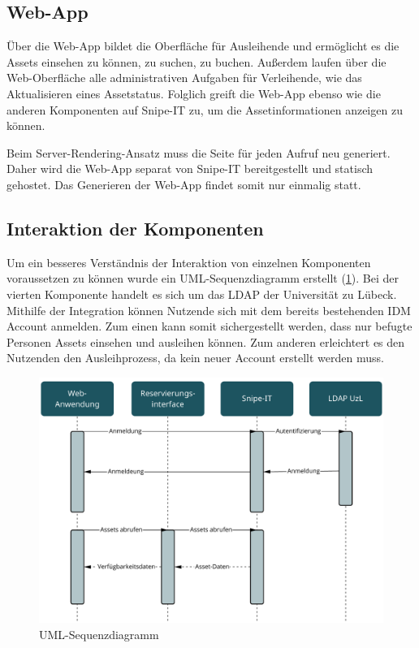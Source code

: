 \subsection{Web-App}
Über die Web-App bildet die Oberfläche für Ausleihende und ermöglicht es die Assets einsehen zu
können, zu suchen, zu buchen. Außerdem laufen über die Web-Oberfläche alle administrativen Aufgaben
für Verleihende, wie das Aktualisieren eines Assetstatus. Folglich greift die Web-App ebenso wie die
anderen Komponenten auf Snipe-IT zu, um die Assetinformationen anzeigen zu können. 

Beim Server-Rendering-Ansatz muss die Seite für jeden Aufruf neu generiert. Daher wird die Web-App
separat von Snipe-IT bereitgestellt und statisch gehostet. Das Generieren der Web-App findet somit
nur einmalig statt.

\subsection{Interaktion der Komponenten}
Um ein besseres Verständnis der Interaktion von einzelnen Komponenten voraussetzen zu können wurde
ein UML-Sequenzdiagramm erstellt (\ref{fig:uml}). Bei der vierten Komponente handelt es sich um das
LDAP der Universität zu Lübeck. Mithilfe der Integration können Nutzende sich mit dem bereits
bestehenden IDM Account anmelden. Zum einen kann somit sichergestellt werden, dass nur befugte
Personen Assets einsehen und ausleihen können. Zum anderen erleichtert es den Nutzenden den
Ausleihprozess, da kein neuer Account erstellt werden muss.

\begin{figure}[h]
    \centering
    \includegraphics[scale=0.45]{Bilder/uml.pdf}
    \caption[UML-Sequenzdiagramm]{UML-Sequenzdiagramm}
    \label{fig:uml}
\end{figure}


